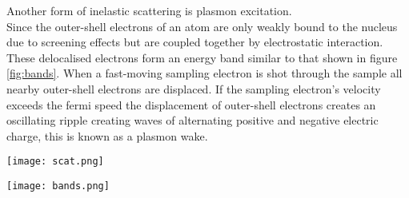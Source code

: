 Another form of inelastic scattering is plasmon excitation.\\
Since the outer-shell electrons of an atom are only weakly bound to the nucleus due to screening effects but are coupled together by electrostatic interaction. These delocalised electrons form an energy band similar to that shown in figure \ref{fig:bands}.
When a fast-moving sampling electron is shot through the sample all nearby outer-shell electrons are displaced. If the sampling electron's velocity exceeds the fermi speed the displacement of outer-shell electrons creates an oscillating ripple creating waves of alternating positive and negative electric charge, this is known as a plasmon wake.\cite{Egerton_2008}

\begin{minipage}{0.48\textwidth}
	\centering
	\captionsetup{width=0.9\linewidth}
	\texttt{[image: scat.png]}
	\label{fig:scat}
\end{minipage}%
\begin{minipage}{0.48\textwidth}
	\centering
	\captionsetup{width=0.9\linewidth}
	\texttt{[image: bands.png]}
	\label{fig:bands}
\end{minipage}


